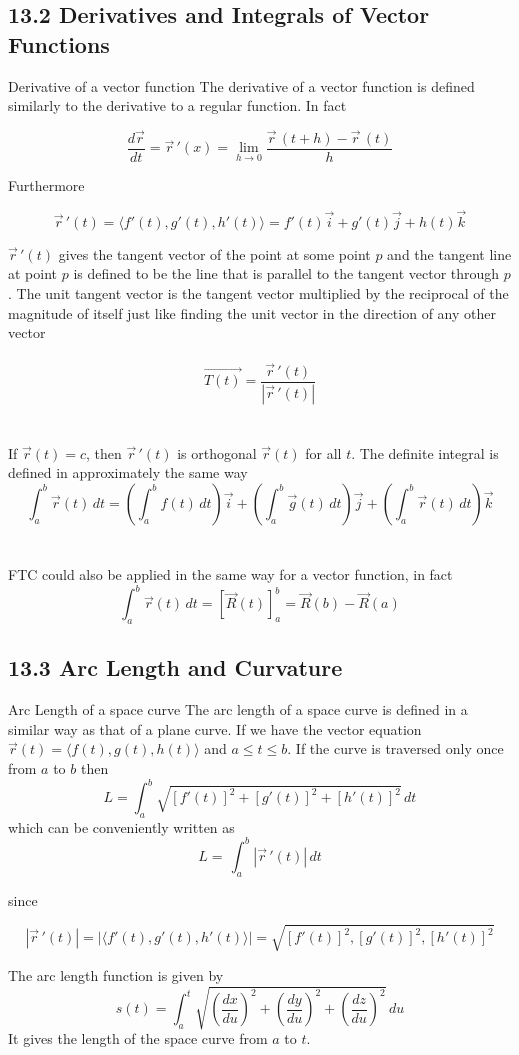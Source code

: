 \documentclass{article}
\begin{document}
	\subsection{13.2 Derivatives and Integrals of Vector Functions}
	\begin{mybox}
		{Derivative of a vector function} The derivative of a vector function is defined
		similarly to the derivative to a regular function. In fact

		\[
			\frac{d\vec{r}}{dt}= \vec{r}\,'(x)=\lim_{h \to 0}\frac{\vec{r}\,(t+h)-\vec{r}\,(t)}{h}
		\]

		Furthermore

		\[
			\vec{r}\,'(t) = \langle f'(t), g'(t), h'(t)\rangle = f'(t)\vec{i}+g'(t)\vec
			{j}+h(t)\vec{k}
		\]
	\end{mybox}
	$\vec{r}\,'(t)$ gives the tangent vector of the point at some point $p$ and the
	tangent line at point $p$ is defined to be the line that is parallel to the tangent
	vector through $p$. The unit tangent vector is the tangent vector multiplied
	by the reciprocal of the magnitude of itself just like finding the unit vector
	in the direction of any other vector \\ \\
	\[
		\vec{T(t)}=\frac{\vec{r}\,'(t)}{|\vec{r}\,'(t)|}
	\]
	\\ \\ If $\vec{r}(t) = c$, then $\vec{r}\,'(t)$ is orthogonal $\vec{r}(t)$ for
	all $t$.
	\newpage
	The definite integral is defined in approximately the same way
	\[
		\int_{a}^{b}\vec{r}(t)\, dt = \left( \int_{a}^{b}f(t)\, dt \right) \vec{i}+ \left
		(\int_{a}^{b}\vec{g}(t)\, dt\right)\vec{j}+ \left(\int_{a}^{b}\vec{r}(t)\, dt
		\right)\vec{k}
	\]
	\\ \\ FTC could also be applied in the same way for a vector function, in fact
	\[
		\int_{a}^{b}\vec{r}(t)\, dt = \left[ \vec{R}(t) \right]_{a}^{b} = \vec{R}(b)
		- \vec{R}(a)
	\]
	\subsection{13.3 Arc Length and Curvature}
	\begin{mybox}
		{Arc Length of a space curve} The arc length of a space curve is defined in a
		similar way as that of a plane curve. If we have the vector equation
		$\vec{r}(t) = \langle f(t), g(t), h(t)\rangle$ and $a \leq t \leq b$. If the
		curve is traversed only once from $a$ to $b$ then
		\[
			L = \int_{a}^{b}\sqrt{ [f'(t)]^{2} + [g'(t)]^{2} + [h'(t)]^{2}}\, dt
		\]
		which can be conveniently written as
		\[
			L = \, \int_{a}^{b}|\vec{r}\,'(t)|\, dt
		\]

		since

		\[
			|\vec{r}\,'(t)| = |\langle f'(t), g'(t), h'(t)\rangle| = \sqrt{ [f'(t)]^{2},
			[g'(t)]^{2}, [h'(t)]^{2}}
		\]
	\end{mybox}
	The arc length function is given by
	\[
		s(t) = \int_{a}^{t}\sqrt{\left(\frac{dx}{du}\right)^{2}+ \left(\frac{dy}{du}\right)^{2}
		+ \left(\frac{dz}{du}\right)^{2} }\, du
	\]
	It gives the length of the space curve from $a$ to $t$.
\end{document}
